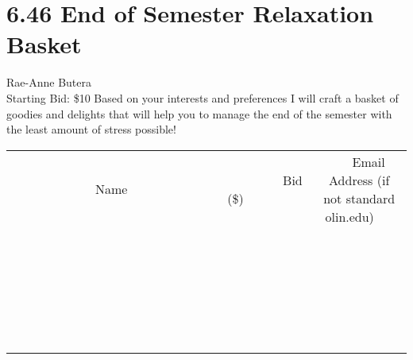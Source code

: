 \documentclass[11pt]{article}
\begin{document}
\section*{6.46 End of Semester Relaxation Basket}
Rae-Anne Butera
\\
Starting Bid: \$10
\newline
Based on your interests and preferences I will craft a basket of goodies and delights that will help you to manage the end of the semester with the least amount of stress possible!
\\[6ex]
\begin{tabular}{c c c}
~~~~~~~~~~~~~Name~~~~~~~~~~~~~ & ~~~~~~~~~Bid (\$)~~~~~~~~~  & ~~~Email Address (if not standard olin.edu)~~~\\
 & & \\
\hline
 & & \\
\hline
 & & \\
\hline
 & & \\
\hline
 & & \\
\hline
 & & \\
\hline
 & & \\
\hline
 & & \\
\hline
 & & \\
\hline
 & & \\
\hline
 & & \\
\hline
 & & \\
\hline
 & & \\
\hline
 & & \\
\hline
 & & \\
\hline
 & & \\
\hline
 & & \\
\hline
 & & \\
\hline
 & & \\
\hline
 & & \\
\hline
 & & \\
\hline
 & & \\
\hline
 & & \\
\hline
 & & \\
\hline
 & & \\
\hline
 & & \\
\hline
\end{tabular}
\newpage
\end{document}
